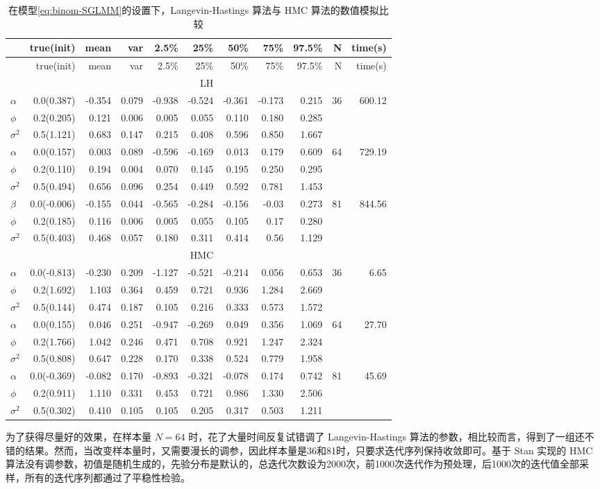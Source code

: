 \documentclass[12pt,a4paper,UTF8,twoside]{book}
\theoremstyle{definition}
\theoremstyle{definition}
\theoremstyle{definition}
\theoremstyle{remark}
\begin{document}
\begin{longtable}[]{@{}lrrrrrrrrrr@{}}
\caption{\label{tab:MCLH-vs-NUTS} 在模型\eqref{eq:binom-SGLMM}的设置下，Langevin-Hastings 算法与 HMC 算法的数值模拟比较}\tabularnewline
\toprule
& true(init) & mean & var & 2.5\% & 25\% & 50\% & 75\% & 97.5\% & N & time(s)\tabularnewline
\midrule
\endfirsthead
\toprule
& true(init) & mean & var & 2.5\% & 25\% & 50\% & 75\% & 97.5\% & N & time(s)\tabularnewline
\midrule
\endhead
& & & & & LH & & & & &\tabularnewline
\(\alpha\) & 0.0(0.387) & -0.354 & 0.079 & -0.938 & -0.524 & -0.361 & -0.173 & 0.215 & 36 & 600.12\tabularnewline
\(\phi\) & 0.2(0.205) & 0.121 & 0.006 & 0.005 & 0.055 & 0.110 & 0.180 & 0.285 & &\tabularnewline
\(\sigma^2\) & 0.5(1.121) & 0.683 & 0.147 & 0.215 & 0.408 & 0.596 & 0.850 & 1.667 & &\tabularnewline
\(\alpha\) & 0.0(0.157) & 0.003 & 0.089 & -0.596 & -0.169 & 0.013 & 0.179 & 0.609 & 64 & 729.19\tabularnewline
\(\phi\) & 0.2(0.110) & 0.194 & 0.004 & 0.070 & 0.145 & 0.195 & 0.250 & 0.295 & &\tabularnewline
\(\sigma^2\) & 0.5(0.494) & 0.656 & 0.096 & 0.254 & 0.449 & 0.592 & 0.781 & 1.453 & &\tabularnewline
\(\beta\) & 0.0(-0.006) & -0.155 & 0.044 & -0.565 & -0.284 & -0.156 & -0.03 & 0.273 & 81 & 844.56\tabularnewline
\(\phi\) & 0.2(0.185) & 0.116 & 0.006 & 0.005 & 0.055 & 0.105 & 0.17 & 0.280 & &\tabularnewline
\(\sigma^2\) & 0.5(0.403) & 0.468 & 0.057 & 0.180 & 0.311 & 0.414 & 0.56 & 1.129 & &\tabularnewline
& & & & & HMC & & & & &\tabularnewline
\(\alpha\) & 0.0(-0.813) & -0.230 & 0.209 & -1.127 & -0.521 & -0.214 & 0.056 & 0.653 & 36 & 6.65\tabularnewline
\(\phi\) & 0.2(1.692) & 1.103 & 0.364 & 0.459 & 0.721 & 0.936 & 1.284 & 2.669 & &\tabularnewline
\(\sigma^2\) & 0.5(0.144) & 0.474 & 0.187 & 0.105 & 0.216 & 0.333 & 0.573 & 1.572 & &\tabularnewline
\(\alpha\) & 0.0(0.155) & 0.046 & 0.251 & -0.947 & -0.269 & 0.049 & 0.356 & 1.069 & 64 & 27.70\tabularnewline
\(\phi\) & 0.2(1.766) & 1.042 & 0.246 & 0.471 & 0.708 & 0.921 & 1.247 & 2.324 & &\tabularnewline
\(\sigma^2\) & 0.5(0.808) & 0.647 & 0.228 & 0.170 & 0.338 & 0.524 & 0.779 & 1.958 & &\tabularnewline
\(\alpha\) & 0.0(-0.369) & -0.082 & 0.170 & -0.893 & -0.321 & -0.078 & 0.174 & 0.742 & 81 & 45.69\tabularnewline
\(\phi\) & 0.2(0.911) & 1.110 & 0.331 & 0.453 & 0.721 & 0.986 & 1.330 & 2.506 & &\tabularnewline
\(\sigma^2\) & 0.5(0.302) & 0.410 & 0.105 & 0.105 & 0.205 & 0.317 & 0.503 & 1.211 & &\tabularnewline
\bottomrule
\end{longtable}

为了获得尽量好的效果，在样本量 \(N = 64\) 时，花了大量时间反复试错调了 Langevin-Hastings 算法的参数，相比较而言，得到了一组还不错的结果。然而，当改变样本量时，又需要漫长的调参，因此样本量是36和81时，只要求迭代序列保持收敛即可。基于 Stan 实现的 HMC 算法没有调参数，初值是随机生成的，先验分布是默认的，总迭代次数设为2000次，前1000次迭代作为预处理，后1000次的迭代值全部采样，所有的迭代序列都通过了平稳性检验。
\end{document}
